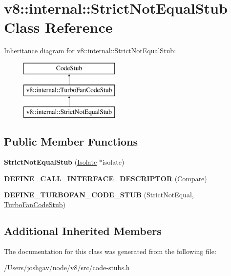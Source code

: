 \hypertarget{classv8_1_1internal_1_1_strict_not_equal_stub}{}\section{v8\+:\+:internal\+:\+:Strict\+Not\+Equal\+Stub Class Reference}
\label{classv8_1_1internal_1_1_strict_not_equal_stub}
Inheritance diagram for v8\+:\+:internal\+:\+:Strict\+Not\+Equal\+Stub\+:\begin{figure}[H]
\begin{center}
\leavevmode
\includegraphics[height=3.000000cm]{classv8_1_1internal_1_1_strict_not_equal_stub}
\end{center}
\end{figure}
\subsection*{Public Member Functions}
\begin{DoxyCompactItemize}
\item 
{\bfseries Strict\+Not\+Equal\+Stub} (\hyperlink{classv8_1_1internal_1_1_isolate}{Isolate} $\ast$isolate)\hypertarget{classv8_1_1internal_1_1_strict_not_equal_stub_a34d45833322f815499f23976663b2b8f}{}\label{classv8_1_1internal_1_1_strict_not_equal_stub_a34d45833322f815499f23976663b2b8f}

\item 
{\bfseries D\+E\+F\+I\+N\+E\+\_\+\+C\+A\+L\+L\+\_\+\+I\+N\+T\+E\+R\+F\+A\+C\+E\+\_\+\+D\+E\+S\+C\+R\+I\+P\+T\+OR} (Compare)\hypertarget{classv8_1_1internal_1_1_strict_not_equal_stub_aab0a8302114dd52e3fb5dc27ec426b5c}{}\label{classv8_1_1internal_1_1_strict_not_equal_stub_aab0a8302114dd52e3fb5dc27ec426b5c}

\item 
{\bfseries D\+E\+F\+I\+N\+E\+\_\+\+T\+U\+R\+B\+O\+F\+A\+N\+\_\+\+C\+O\+D\+E\+\_\+\+S\+T\+UB} (Strict\+Not\+Equal, \hyperlink{classv8_1_1internal_1_1_turbo_fan_code_stub}{Turbo\+Fan\+Code\+Stub})\hypertarget{classv8_1_1internal_1_1_strict_not_equal_stub_a62c35fa6c59a49bc554e1778bd4f7ca7}{}\label{classv8_1_1internal_1_1_strict_not_equal_stub_a62c35fa6c59a49bc554e1778bd4f7ca7}

\end{DoxyCompactItemize}
\subsection*{Additional Inherited Members}


The documentation for this class was generated from the following file\+:\begin{DoxyCompactItemize}
\item 
/\+Users/joshgav/node/v8/src/code-\/stubs.\+h\end{DoxyCompactItemize}
